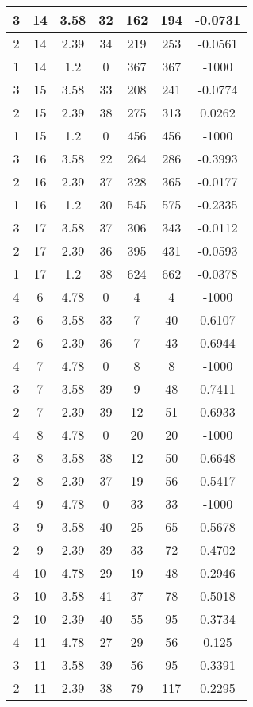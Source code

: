 \documentclass[letterpaper, 12pt]{article}
\begin{document}
\begin{longtable}{|c|c|c|c|c|c|c|}
\hline
3 & 14 & 3.58 & 32 & 162 & 194 & -0.0731 \\
\hline
2 & 14 & 2.39 & 34 & 219 & 253 & -0.0561 \\
\hline
1 & 14 & 1.2 & 0 & 367 & 367 & -1000 \\
\hline
3 & 15 & 3.58 & 33 & 208 & 241 & -0.0774 \\
\hline
2 & 15 & 2.39 & 38 & 275 & 313 & 0.0262 \\
\hline
1 & 15 & 1.2 & 0 & 456 & 456 & -1000 \\
\hline
3 & 16 & 3.58 & 22 & 264 & 286 & -0.3993 \\
\hline
2 & 16 & 2.39 & 37 & 328 & 365 & -0.0177 \\
\hline
1 & 16 & 1.2 & 30 & 545 & 575 & -0.2335 \\
\hline
3 & 17 & 3.58 & 37 & 306 & 343 & -0.0112 \\
\hline
2 & 17 & 2.39 & 36 & 395 & 431 & -0.0593 \\
\hline
1 & 17 & 1.2 & 38 & 624 & 662 & -0.0378 \\
\hline
4 & 6 & 4.78 & 0 & 4 & 4 & -1000 \\
\hline
3 & 6 & 3.58 & 33 & 7 & 40 & 0.6107 \\
\hline
2 & 6 & 2.39 & 36 & 7 & 43 & 0.6944 \\
\hline
4 & 7 & 4.78 & 0 & 8 & 8 & -1000 \\
\hline
3 & 7 & 3.58 & 39 & 9 & 48 & 0.7411 \\
\hline
2 & 7 & 2.39 & 39 & 12 & 51 & 0.6933 \\
\hline
4 & 8 & 4.78 & 0 & 20 & 20 & -1000 \\
\hline
3 & 8 & 3.58 & 38 & 12 & 50 & 0.6648 \\
\hline
2 & 8 & 2.39 & 37 & 19 & 56 & 0.5417 \\
\hline
4 & 9 & 4.78 & 0 & 33 & 33 & -1000 \\
\hline
3 & 9 & 3.58 & 40 & 25 & 65 & 0.5678 \\
\hline
2 & 9 & 2.39 & 39 & 33 & 72 & 0.4702 \\
\hline
4 & 10 & 4.78 & 29 & 19 & 48 & 0.2946 \\
\hline
3 & 10 & 3.58 & 41 & 37 & 78 & 0.5018 \\
\hline
2 & 10 & 2.39 & 40 & 55 & 95 & 0.3734 \\
\hline
4 & 11 & 4.78 & 27 & 29 & 56 & 0.125 \\
\hline
3 & 11 & 3.58 & 39 & 56 & 95 & 0.3391 \\
\hline
2 & 11 & 2.39 & 38 & 79 & 117 & 0.2295 \\

\end{longtable}
\end{document}
